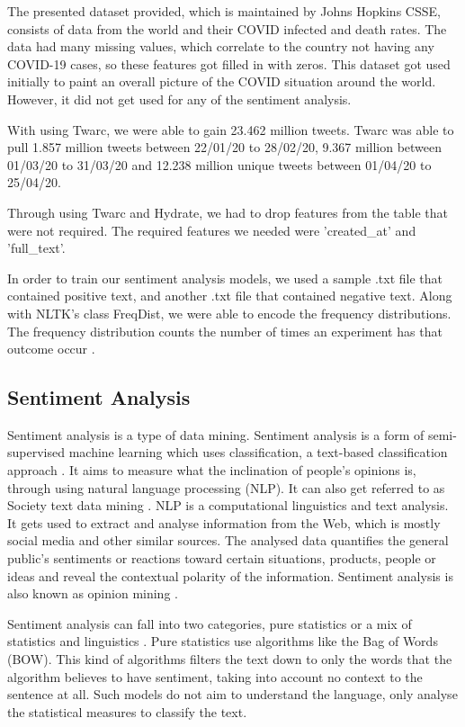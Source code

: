 \documentclass[a4paper,10pt]{article}
\begin{document}
The presented dataset provided, which is maintained by Johns Hopkins CSSE, consists of data from the world and their COVID infected and death rates. The data had many missing values, which correlate to the country not having any COVID-19 cases, so these features got filled in with zeros. This dataset got used initially to paint an overall picture of the COVID situation around the world. However, it did not get used for any of the sentiment analysis.

With using Twarc, we were able to gain 23.462 million tweets. Twarc was able to pull 1.857 million tweets between 22/01/20 to 28/02/20, 9.367 million between 01/03/20 to 31/03/20 and 12.238 million unique tweets between 01/04/20 to 25/04/20.

Through using Twarc and Hydrate, we had to drop features from the table that were not required. The required features we needed were 'created\_at' and 'full\_text'.

In order to train our sentiment analysis models, we used a sample .txt file that contained positive text, and another .txt file that contained negative text. Along with NLTK's class FreqDist, we were able to encode the frequency distributions. The frequency distribution counts the number of times an experiment has that outcome occur \cite{nltkfreqdist}.

\subsection{Sentiment Analysis}
Sentiment analysis is a type of data mining. Sentiment analysis is a form of semi-supervised machine learning \cite{intro2datamining book} which uses classification, a text-based classification approach \cite{jjslidesNLP}. It aims to measure what the inclination of people's opinions is, through using natural language processing (NLP). It can also get referred to as Society text data mining \cite{jjslideNLP}. NLP is a computational linguistics and text analysis. It gets used to extract and analyse information from the Web, which is mostly social media and other similar sources. The analysed data quantifies the general public's sentiments or reactions toward certain situations, products, people or ideas and reveal the contextual polarity of the information. Sentiment analysis is also known as opinion mining \cite{towarddatasciencesentiment}.

Sentiment analysis can fall into two categories, pure statistics or a mix of statistics and linguistics \cite{towarddatasciencesentiment}. Pure statistics use algorithms like the Bag of Words (BOW). This kind of algorithms filters the text down to only the words that the algorithm believes to have sentiment, taking into account no context to the sentence at all. Such models do not aim to understand the language, only analyse the statistical measures to classify the text. 
\end{document}
